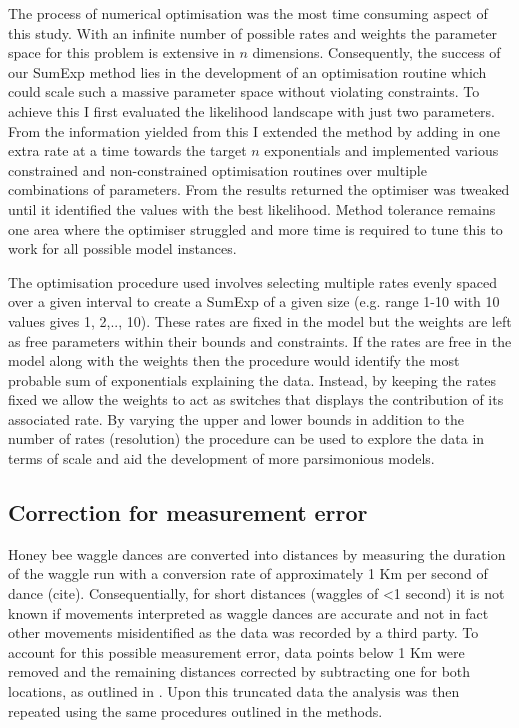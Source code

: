 \documentclass[11pt,usenames,dvipsnames,a4paper]{article}
\begin{document}
\begin{linenumbers}
The process of numerical optimisation was the most time consuming aspect of this study. With an infinite number of possible rates and weights the parameter space for this problem is extensive in $n$ dimensions. Consequently, the success of our SumExp method lies in the development of an optimisation routine which could scale such a massive parameter space without violating constraints. To achieve this I first evaluated the likelihood landscape with just two parameters. From the information yielded from this I extended the method by adding in one extra rate at a time towards the target $n$ exponentials and implemented various constrained and non-constrained optimisation routines over multiple combinations of parameters. From the results returned the optimiser was tweaked until it identified the values with the best likelihood. Method tolerance remains one area where the optimiser struggled and more time is required to tune this to work for all possible model instances.

The optimisation procedure used involves selecting multiple rates evenly spaced over a given interval to create a SumExp of a given size (e.g. range 1-10 with 10 values gives 1, 2,.., 10). These rates are fixed in the model but the weights are left as free parameters within their bounds and constraints. If the rates are free in the model along with the weights then the procedure would identify the most probable sum of exponentials explaining the data. Instead, by keeping the rates fixed we allow the weights to act as switches that displays the contribution of its associated rate. By varying the upper and lower bounds in addition to the number of rates (resolution) the procedure can be used to explore the data in terms of scale and aid the development of more parsimonious models. 
\end{linenumbers}

\subsection{Correction for measurement error}

\begin{linenumbers}
\hspace{\parindent}
Honey bee waggle dances are converted into distances by measuring the duration of the waggle run with a conversion rate of approximately 1 Km per second of dance (cite). Consequentially, for short distances (waggles of \textless 1 second) it is not known if movements interpreted as waggle dances are accurate and not in fact other movements misidentified as the data was recorded by a third party. To account for this possible measurement error, data points below 1 Km were removed and the remaining distances corrected by subtracting one for both locations, as outlined in \cite{Petrovskii2011}. Upon this truncated data the analysis was then repeated using the same procedures outlined in the methods.
\end{linenumbers}
\end{document}
